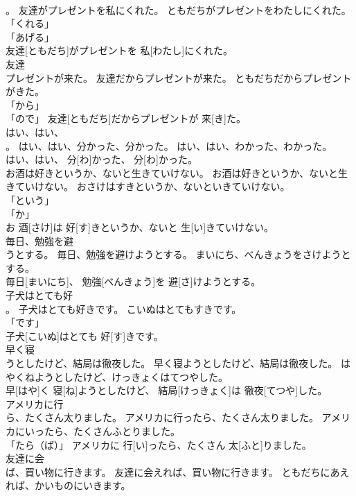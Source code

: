 \documentclass[8pt]{extreport}
\begin{document}
\begin{CJK}{UTF8}{min}
\\	。	友達がプレゼントを私にくれた。	ともだちがプレゼントをわたしにくれた。	
\\	「くれる」 
\\	「あげる」 
\\	友達[ともだち]がプレゼントを 私[わたし]にくれた。		
\\	友達
\\	プレゼントが来た。	友達だからプレゼントが来た。	ともだちだからプレゼントがきた。	
\\	「から」 
\\	「ので」	友達[ともだち]だからプレゼントが 来[き]た。		
\\	はい、はい、
\\	。	はい、はい、分かった、分かった。	はい、はい、わかった、わかった。	
\\	はい、はい、 分[わ]かった、 分[わ]かった。		
\\	お酒は好きというか、ないと生きていけない。	お酒は好きというか、ないと生きていけない。	おさけはすきというか、ないといきていけない。	
\\	「という」 
\\	「か」 
\\	お 酒[さけ]は 好[す]きというか、ないと 生[い]きていけない。		
\\	毎日、勉強を避
\\	うとする。	毎日、勉強を避けようとする。	まいにち、べんきょうをさけようとする。	
\\	毎日[まいにち]、 勉強[べんきょう]を 避[さ]けようとする。		
\\	子犬はとても好
\\	。	子犬はとても好きです。	こいぬはとてもすきです。	
\\	「です」 
\\	子犬[こいぬ]はとても 好[す]きです。		
\\	早く寝
\\	うとしたけど、結局は徹夜した。	早く寝ようとしたけど、結局は徹夜した。	はやくねようとしたけど、けっきょくはてつやした。	
\\	早[はや]く 寝[ね]ようとしたけど、 結局[けっきょく]は 徹夜[てつや]した。		
\\	アメリカに行
\\	ら、たくさん太りました。	アメリカに行ったら、たくさん太りました。	アメリカにいったら、たくさんふとりました。	
\\	「たら（ば）」	アメリカに 行[い]ったら、たくさん 太[ふと]りました。		
\\	友達に会
\\	ば、買い物に行きます。	友達に会えれば、買い物に行きます。	ともだちにあえれば、かいものにいきます。	

\end{CJK}
\end{document}
